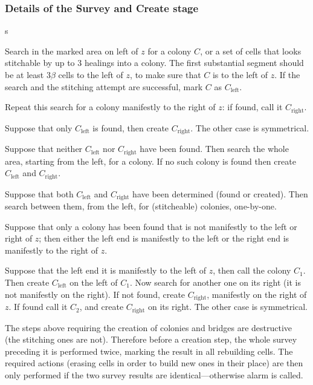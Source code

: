 \documentclass[11pt]{memoir}
\theoremstyle{definition} %
\newcommand{\Left}{\text{left}}
\newcommand{\Right}{\text{right}}
\begin{document}
\subsubsection*{Details of the Survey and Create stage}

\begin{varenum}{s}
\item\label{i:survey.left}
Search in the marked area on left of \( z \) for a colony \( C \),
or a set of cells that looks stitchable by up to 3 healings into a colony.
The first substantial segment should be at least \( 3\beta \) cells to the left of \( z \),
to make sure that \( C \) is  to the left of \( z \).
If the search and the stitching attempt are successful, mark \( C \) as \( C_{\Left} \).

Repeat this search for a colony manifestly to the right of \( z \): if found, call it \( C_{\Right} \).

\item Suppose that only \( C_{\Left} \) is found, then create \( C_{\Right} \).
The other case is symmetrical.

\item Suppose that neither \( C_{\Left} \) nor \( C_{\Right} \) have been found.
Then search the whole area, starting from the left, for a colony.
If no such colony is found then create \( C_{\Left} \) and \( C_{\Right} \).

\item\label{i:survey.both} Suppose that both \( C_{\Left} \) and \( C_{\Right} \) 
have been determined (found or created).
Then search between them, from the left, for (stitcheable) colonies, one-by-one.

\item Suppose that only a colony has been found that 
is not manifestly to the left or right of \( z \); then either the left end is manifestly to the left or
the right end is manifestly to the right of \( z \).

Suppose that the left end it is manifestly to the left of \( z \), then call the colony \( C_{1} \).
Then create \( C_{\Left} \) on the left of  \( C_{1} \).
Now search for another one on its right (it is not manifestly on the right).
If not found, create \( C_{\Right} \), manifestly on the right of \( z \).
If found call it \( C_{2} \), and create \( C_{\Right} \) on its right.
The other case is symmetrical.

\end{varenum}

The steps above requiring the creation of colonies and bridges are destructive
(the stitching ones are not).
Therefore before a creation step, the whole survey preceding it is performed twice, 
marking the result in all rebuilding cells.
The required actions (erasing cells in order to build new ones in their place)
are then only performed if the two survey results are identical---otherwise alarm is called.
\end{document}
